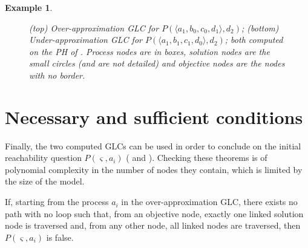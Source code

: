 \documentclass{movep}
\def\pref{\prettyref}
\newtheorem*{example*}{Example}{\itshape}{}
\newcommand{\PHfrappeB}{\Rsh}
\newcommand{\PHobjectif}[2]{\mbox{$#1\PHfrappeB^*\!#2$}}
\newcommand{\PHobj}{\PHobjectif}
\def\ctx{\varsigma}
\newcommand{\Pcai}{P(\ctx, a_i)}
\newcommand{\PHetat}[1]{\mbox{$\langle #1 \rangle$}}
\def\ctx{\varsigma}
\newcounter{la}
\begin{document}
\begin{example*}
\begin{figure}[ht]

\caption{\label{fig:glc}
(top) Over-approximation GLC for $P(\PHetat{a_1,b_0,c_0,d_1}, d_2)$;
(bottom) Under-approximation GLC for $P(\PHetat{a_1,b_1,c_1,d_0}, d_2)$;
both computed on the PH of \pref{fig:ph}.
%
%
Process nodes are in boxes,
solution nodes are the small circles (and are not detailed)
and objective nodes are the nodes with no border.}
\end{figure}
\end{example*}



\section{Necessary and sufficient conditions}
\label{sec:th}

Finally, the two computed GLCs can be used in order to conclude on the initial reachability question
$\Pcai$ (\pref{th:oa} and \pref{th:ua}).
Checking these theorems is of polynomial complexity in the number of nodes they contain,
which is limited by the size of the model.

\begin{theorem}
\label{th:oa}
  If, starting from the process $a_i$ in the over-approximation GLC,
  there exists no path with no loop such that,
  from an objective node, exactly one linked solution node is traversed
  and, from any other node, all linked nodes are traversed,
  then $\Pcai$ is false.
\end{theorem}
\end{document}
